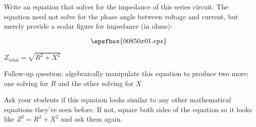 

Write an equation that solves for the impedance of this series circuit.  The equation need not solve for the phase angle between voltage and current, but merely provide a scalar figure for impedance (in ohms):

$$\epsfbox{00850x01.eps}$$







$Z_{total} = \sqrt{R^2 + X^2}$

\vskip 10pt

Follow-up question: algebraically manipulate this equation to produce two more; one solving for $R$ and the other solving for $X$.







Ask your students if this equation looks similar to any other mathematical equations they've seen before.  If not, square both sides of the equation so it looks like $Z^2 = R^2 + X^2$ and ask them again.




